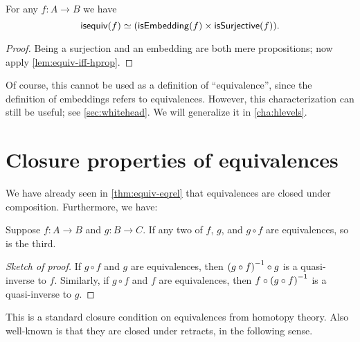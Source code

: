 \begin{cor}
  For any $f:A\to B$ we have
  \[ \mathsf{isequiv}(f) \simeq (\mathsf{isEmbedding}(f) \times \mathsf{isSurjective}(f)).\]
\end{cor}
\begin{proof}
  Being a surjection and an embedding are both mere propositions; now apply \autoref{lem:equiv-iff-hprop}.
\end{proof}

Of course, this cannot be used as a definition of ``equivalence'', since the definition of embeddings refers to equivalences.
However, this characterization can still be useful; see \autoref{sec:whitehead}.
We will generalize it in \autoref{cha:hlevels}.


\section{Closure properties of equivalences}
\label{sec:equiv-closures}
\label{sec:fiberwise-equivalences}

We have already seen in \autoref{thm:equiv-eqrel} that equivalences are closed under composition.
Furthermore, we have:

\begin{thm}\label{thm:two-out-of-three}
  Suppose $f:A\to B$ and $g:B\to C$.
  If any two of $f$, $g$, and $g\circ f$ are equivalences, so is the third.
\end{thm}
\begin{proof}[Sketch of proof]
  If $g\circ f$ and $g$ are equivalences, then $\mathord{{(g\circ f)}^{-1}} \circ g$ is a quasi-inverse to $f$.
  Similarly, if $g\circ f$ and $f$ are equivalences, then $f\circ \mathord{{(g\circ f)}^{-1}}$ is a quasi-inverse to $g$.
\end{proof}

This is a standard closure condition on equivalences from homotopy theory.
Also well-known is that they are closed under retracts, in the following sense.

